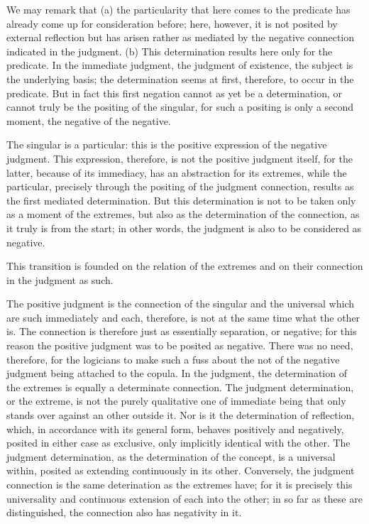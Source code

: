 We may remark that
(a) the particularity that here comes to the predicate has
already come up for consideration before;
here, however, it is not posited by external reflection
but has arisen rather as mediated by the negative connection
indicated in the judgment.
(b) This determination results here only for the predicate.
In the immediate judgment, the judgment of existence,
the subject is the underlying basis;
the determination seems at first, therefore, to occur in the predicate.
But in fact this first negation cannot as yet be a determination,
or cannot truly be the positing of the singular,
for such a positing is only a second moment,
the negative of the negative.

The singular is a particular:
this is the positive expression of the negative judgment.
This expression, therefore, is not the positive judgment itself,
for the latter, because of its immediacy,
has an abstraction for its extremes,
while the particular,
precisely through the positing of the judgment connection,
results as the first mediated determination.
But this determination is not to be taken
only as a moment of the extremes,
but also as the determination of the connection,
as it truly is from the start;
in other words, the judgment is also
to be considered as negative.

This transition is founded on
the relation of the extremes
and on their connection
in the judgment as such.

The positive judgment is the connection of
the singular and the universal
which are such immediately and each, therefore,
is not at the same time what the other is.
The connection is therefore just as
essentially separation, or negative;
for this reason the positive judgment was to be posited as negative.
There was no need, therefore,
for the logicians to make such a fuss about
the not of the negative judgment
being attached to the copula.
In the judgment, the determination of the extremes is
equally a determinate connection.
The judgment determination, or the extreme,
is not the purely qualitative one of immediate being that
only stands over against an other outside it.
Nor is it the determination of reflection,
which, in accordance with its general form,
behaves positively and negatively,
posited in either case as exclusive,
only implicitly identical with the other.
The judgment determination,
as the determination of the concept,
is a universal within, posited as extending continuously in its other.
Conversely, the judgment connection is
the same deterination as the
extremes have;
for it is precisely this universality and continuous extension
of each into the other;
in so far as these are distinguished,
the connection also has negativity in it.


